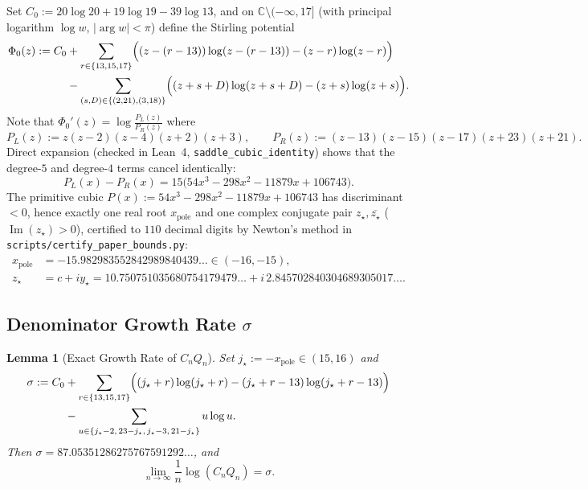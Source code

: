 \documentclass[11pt,reqno]{amsart}
\newtheorem{lemma}[theorem]{Lemma}
\theoremstyle{definition}
\theoremstyle{remark}
\newcommand{\CC}{\mathbb{C}}
\begin{document}
Set $C_0 := 20\log 20 + 19\log 19 - 39\log 13$, and on $\CC \setminus (-\infty, 17]$ (with principal logarithm $\log w$, $|\arg w| < \pi$) define the Stirling potential
\begin{equation}
\label{eq:Phi0}
\begin{aligned}
  \Phi_0(z)
  := C_0 &+ \sum_{r \in \{13, 15, 17\}} \Bigl((z - (r-13))\log(z - (r-13)) - (z - r)\log(z - r)\Bigr) \\
         &- \sum_{(s, D) \in \{(2,21), (3,18)\}} \Bigl((z + s + D)\log(z + s + D) - (z + s)\log(z + s)\Bigr).
\end{aligned}
\end{equation}
Note that $\Phi_0'(z) = \log\frac{P_L(z)}{P_R(z)}$ where
\[
  P_L(z) := z(z - 2)(z - 4)(z + 2)(z + 3),
  \qquad
  P_R(z) := (z - 13)(z - 15)(z - 17)(z + 23)(z + 21).
\]
Direct expansion (checked in Lean~4, \texttt{saddle\_cubic\_identity}) shows that the degree-$5$ and degree-$4$ terms cancel identically:
\begin{equation}
\label{eq:saddle-cubic}
  P_L(x) - P_R(x) = 15\bigl(54x^3 - 298x^2 - 11879x + 106743\bigr).
\end{equation}
The primitive cubic $P(x) := 54x^3 - 298x^2 - 11879x + 106743$ has discriminant $< 0$, hence exactly one real root $x_{\mathrm{pole}}$ and one complex conjugate pair $z_\star, \overline{z_\star}$ ($\operatorname{Im}(z_\star) > 0$), certified to $110$ decimal digits by Newton's method in \texttt{scripts/certify\_paper\_bounds.py}:
\begin{equation}
\label{eq:roots}
\begin{aligned}
  x_{\mathrm{pole}} &= -15.982983552842989840439\ldots \in (-16, -15), \\
  z_\star &= c + i y_\star = 10.750751035680754179479\ldots + i\, 2.845702840304689305017\ldots.
\end{aligned}
\end{equation}

\subsection{Denominator Growth Rate \texorpdfstring{$\sigma$}{sigma}}
\begin{lemma}[Exact Growth Rate of $C_n Q_n$]
\label{lem:sigma}
Set $j_\star := -x_{\mathrm{pole}} \in (15, 16)$ and
\begin{align*}
  \sigma := C_0 &+ \sum_{r \in \{13, 15, 17\}} \Bigl((j_\star + r)\log(j_\star + r) - (j_\star + r - 13)\log(j_\star + r - 13)\Bigr) \\
                &- \sum_{u \in \{j_\star - 2,\, 23 - j_\star,\, j_\star - 3,\, 21 - j_\star\}} u\log u.
\end{align*}
Then $\sigma = 87.05351286275767591292\ldots$, and
\begin{equation}
\label{eq:sigma-lim}
  \lim_{n \to \infty} \frac{1}{n} \log(C_n Q_n) = \sigma.
\end{equation}
\end{lemma}
\end{document}
